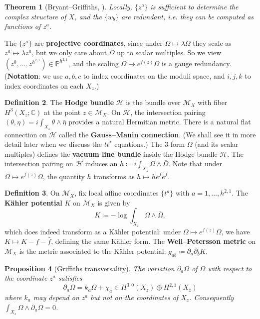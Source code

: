 \documentclass{report}
\theoremstyle{plain}
\newtheorem{theorem}{Theorem}[section]
\newtheorem{proposition}[theorem]{Proposition}
\theoremstyle{definition}
\newtheorem{definition}[theorem]{Definition}
\theoremstyle{remark}
\newcommand{\di}{\partial}
\newcommand{\bC}{\mathbb{C}}
\newcommand{\bP}{\mathbb{P}}
\newcommand{\cH}{\mathcal{H}}
\newcommand{\cM}{\mathcal{M}}
\newcommand{\bdi}{\bar{\di}}
\begin{document}
\begin{theorem}[Bryant--Griffiths, \cite{Bryant1983}]
  Locally, $\{z^a\}$ is sufficient to determine the complex structure
  of $X$, and the $\{w_b\}$ are redundant, i.e. they can be computed
  as functions of $z^a$.
\end{theorem}

The $\{z^a\}$ are {\bf projective coordinates}, since under $\Omega
\mapsto \lambda \Omega$ they scale as $z^a \mapsto \lambda z^a$, but
we only care about $\Omega$ up to scalar multiples. So we view $(z^0,
\ldots, z^{h^{2,1}}) \in \bP^{h^{2,1}}$, and the scaling $\Omega
\mapsto e^{f(z)}\Omega$ is a gauge redundancy. ({\bf Notation}: we use
$a, b, c$ to index coordinates on the moduli space, and $i, j, k$ to
index coordinates on each $X_z$.)

\begin{definition} \label{def:hodge-bundle}
  The {\bf Hodge bundle} $\cH$ is the bundle over $\cM_X$ with fiber
  $H^3(X_z; \bC)$ at the point $z \in \cM_X$. On $\cH$, the
  intersection pairing $(\theta, \eta) = i\int_{X_z} \theta \wedge
  \bar{\eta}$ provides a natural Hermitian metric. There is a natural
  flat connection on $\cH$ called the {\bf Gauss--Manin connection}.
  (We shall see it in more detail later when we discuss the $tt^*$
  equations.) The $3$-form $\Omega$ (and its scalar multiples) defines
  the {\bf vacuum line bundle} inside the Hodge bundle $\cH$. The
  intersection pairing on $\cH$ induces an $h \coloneqq i\int_{X_z}
  \Omega \wedge \bar{\Omega}$. Note that under $\Omega \mapsto
  e^{f(z)} \Omega$, the quantity $h$ transforms as $h \mapsto h e^f
  e^{\bar{f}}$.
\end{definition}

\begin{definition}
  On $\cM_X$, fix local affine coordinates $\{t^a\}$ with $a=1,
  \ldots, h^{2,1}$. The {\bf K\"ahler potential} $K$ on $\cM_X$ is
  given by
  \[ K \coloneqq -\log \int_{X_z} \Omega \wedge \bar{\Omega}, \]
  which does indeed transform as a K\"ahler potential: under $\Omega
  \mapsto e^{f(z)} \Omega$, we have $K \mapsto K - f - \bar{f}$,
  defining the same K\"ahler form. The {\bf Weil--Petersson metric} on
  $\cM_X$ is the metric associated to the K\"ahler potential:
  $g_{a\bar{b}} \coloneqq \di_a \bdi_{\bar{b}} K$.
\end{definition}

\begin{proposition}[Griffiths transversality] \label{thm:griffiths-transversality}
  The variation $\di_a\Omega$ of $\Omega$ with respect to the
  coordinate $z^a$ satisfies
  \[ \di_a\Omega = k_a \Omega + \chi_a \in H^{3,0}(X_z) \oplus H^{2,1}(X_z) \]
  where $k_a$ may depend on $z^a$ but not on the coordinates
  of $X_z$. Consequently $\int_{X_z} \Omega \wedge \di_a\Omega = 0$.
\end{proposition}
\end{document}
